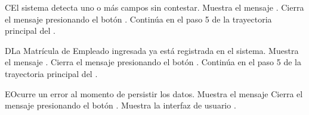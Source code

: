 \begin{UCtrayectoriaA}{C}{El sistema detecta uno o más campos sin contestar.}
    \UCpaso Muestra el mensaje .
    \UCpaso[\UCactor] Cierra el mensaje presionando el botón .
    \UCpaso Continúa en el paso 5 de la trayectoria principal del .
\end{UCtrayectoriaA}
\begin{UCtrayectoriaA}{D}{La Matrícula de Empleado ingresada ya está registrada en el sistema.}
    \UCpaso Muestra el mensaje .
    \UCpaso[\UCactor] Cierra el mensaje presionando el botón .
    \UCpaso Continúa en el paso 5 de la trayectoria principal del .
\end{UCtrayectoriaA}
\begin{UCtrayectoriaA}{E}{Ocurre un error al momento de persistir los datos.}
    \UCpaso Muestra el mensaje 
    \UCpaso[\UCactor] Cierra el mensaje presionando el botón .
    \UCpaso Muestra la interfaz de usuario .
\end{UCtrayectoriaA}